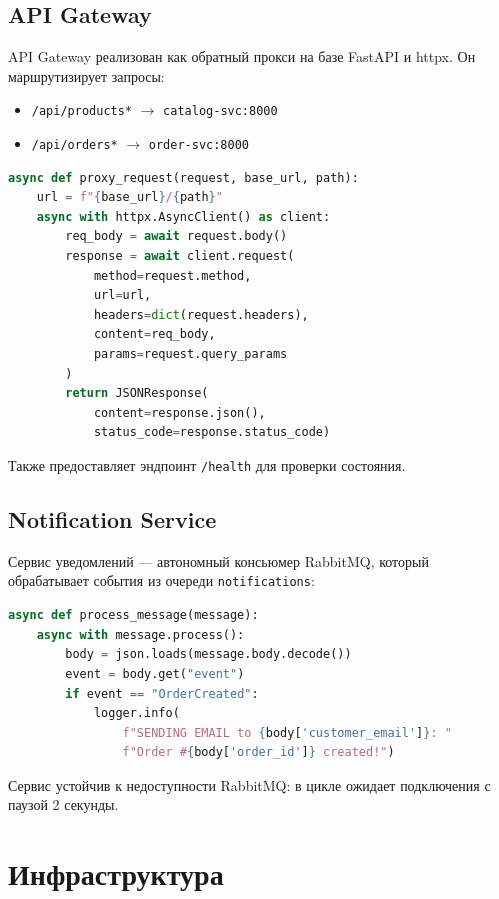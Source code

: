 \documentclass[14pt]{article}
\begin{document}
\subsection{API Gateway}

API Gateway реализован как обратный прокси на базе FastAPI и httpx. Он маршрутизирует запросы:
\begin{itemize}
    \item \texttt{/api/products*} $\rightarrow$ \texttt{catalog-svc:8000}
    \item \texttt{/api/orders*} $\rightarrow$ \texttt{order-svc:8000}
\end{itemize}

\begin{lstlisting}[language=Python]
async def proxy_request(request, base_url, path):
    url = f"{base_url}/{path}"
    async with httpx.AsyncClient() as client:
        req_body = await request.body()
        response = await client.request(
            method=request.method,
            url=url,
            headers=dict(request.headers),
            content=req_body,
            params=request.query_params
        )
        return JSONResponse(
            content=response.json(),
            status_code=response.status_code)
\end{lstlisting}

Также предоставляет эндпоинт \texttt{/health} для проверки состояния.

\subsection{Notification Service}

Сервис уведомлений --- автономный консьюмер RabbitMQ, который обрабатывает события из очереди \texttt{notifications}:

\begin{lstlisting}[language=Python]
async def process_message(message):
    async with message.process():
        body = json.loads(message.body.decode())
        event = body.get("event")
        if event == "OrderCreated":
            logger.info(
                f"SENDING EMAIL to {body['customer_email']}: "
                f"Order #{body['order_id']} created!")
\end{lstlisting}

Сервис устойчив к недоступности RabbitMQ: в цикле ожидает подключения с паузой 2 секунды.

\section{Инфраструктура}
\end{document}
